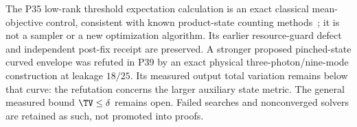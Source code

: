The P35 low-rank threshold expectation calculation is an exact classical mean-objective control, consistent with known product-state counting methods~\cite{ivanov2020}; it is not a sampler or a new optimization algorithm. Its earlier resource-guard defect and independent post-fix receipt are preserved. A stronger proposed pinched-state curved envelope was refuted in P39 by an exact physical three-photon/nine-mode construction at leakage $18/25$. Its measured output total variation remains below that curve: the refutation concerns the larger auxiliary state metric. The general measured bound $\TV\le\delta$ remains open. Failed searches and nonconverged solvers are retained as such, not promoted into proofs.

